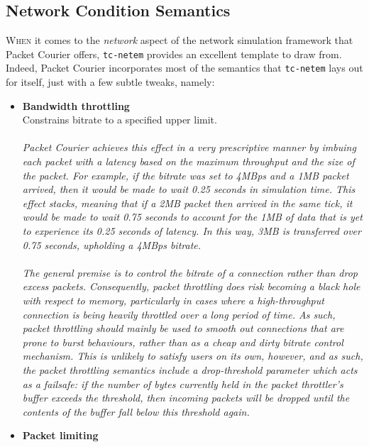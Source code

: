 \newpage

\subsection{Network Condition Semantics}

\lettrine{W}{hen} it comes to the \emph{network} aspect of the network simulation framework that Packet Courier offers,
\texttt{tc-netem}\cite{tc_netem_wiki, tc_netem_8_man,tc_netem_src} provides an excellent template to draw from.
Indeed, Packet Courier incorporates most of the semantics that \texttt{tc-netem} lays out for itself, just with a few
subtle tweaks, namely:
\begin{itemize}
    \item \textbf{Bandwidth throttling} \\
    Constrains bitrate to a specified upper limit. \\ \\
    \emph{Packet Courier achieves this effect in a very prescriptive manner by imbuing each packet with a latency
    based on the maximum throughput and the size of the packet. For example, if the bitrate was set to 4MBps and a
    1MB packet arrived, then it would be made to wait 0.25 seconds in simulation time. This effect stacks, meaning
    that if a 2MB packet then arrived in the same tick, it would be made to wait 0.75 seconds to account for the 1MB
    of data that is yet to experience its 0.25 seconds of latency. In this way, 3MB is transferred over 0.75 seconds,
        upholding a 4MBps bitrate. \\ \\
        The general premise is to control the bitrate of a connection rather than drop excess packets. Consequently,
        packet throttling does risk becoming a black hole with respect to memory, particularly in cases where a
        high-throughput connection is being heavily throttled over a long period of time. As such, packet throttling
        should mainly be used to smooth out connections that are prone to burst behaviours, rather than as a cheap
        and dirty bitrate control mechanism. This is unlikely to satisfy users on its own, however, and as such, the
        packet throttling semantics include a drop-threshold parameter which acts as a failsafe: if the number of
        bytes currently held in the packet throttler's buffer exceeds the threshold, then incoming packets will be
        dropped until the contents of the buffer fall below this threshold again.}
    \item \textbf{Packet limiting} \\

\end{itemize}
